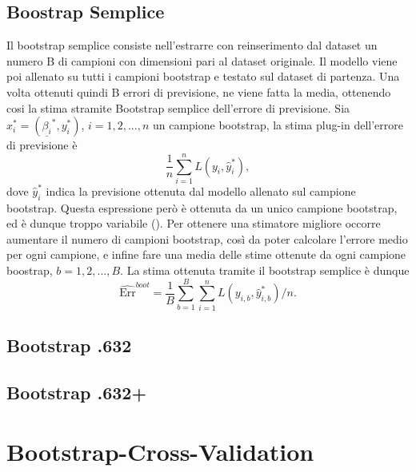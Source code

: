 \subsection{Boostrap Semplice}
\label{sec:sezione5.4.1}

Il bootstrap semplice consiste nell'estrarre con reinserimento dal dataset un numero B di campioni con dimensioni pari al dataset originale. Il modello viene poi allenato su tutti i campioni bootstrap e testato sul dataset di partenza. Una volta ottenuti quindi B errori di previsione, ne viene fatta la media, ottenendo cosi la stima stramite Bootstrap semplice dell'errore di previsione. 
Sia $x^{*}_i =  (\underline{\beta_i}^{*},y^{*}_i)$, $i = 1,2,...,n$ un campione bootstrap, la stima plug-in dell'errore di previsione è
\begin{equation}
\frac{1}{n} \sum_{i=1}^{n} L(y_i, \hat{y}^{*}_i),
\end{equation}
dove $\hat{y}^{*}_i$ indica la previsione ottenuta dal modello allenato sul campione bootstrap.
Questa espressione però è ottenuta da un unico campione bootstrap, ed è dunque troppo variabile (\cite{efron1993}). Per ottenere una stimatore migliore occorre aumentare il numero di campioni bootstrap, così da poter calcolare l'errore medio per ogni campione, e infine fare una media delle stime ottenute da ogni campione boostrap, $b = 1,2,...,B$.
La stima ottenuta tramite il bootstrap semplice è dunque
\begin{equation}
\widehat{\text{Err}}^{boot} = \frac{1}{B} \sum_{b=1}^{B} \sum_{i=1}^{n}L(y_{i,b}, \hat{y}^{*}_{i,b})/n.
\end{equation}


\subsection{Bootstrap .632}
\label{sec:sezione5.4.3}

\subsection{Bootstrap .632+}
\label{sec:sezione5.4.4}

\section{Bootstrap-Cross-Validation}
\label{sec:sezione5.5}
















